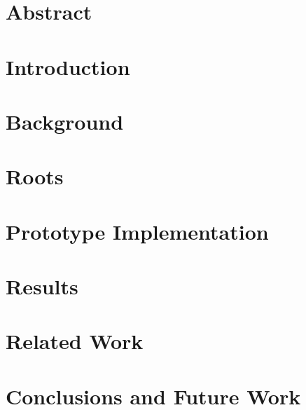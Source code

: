 \section{Abstract}


\section{Introduction}
\label{sec:roots_introduction}


\section{Background}
\label{sec:roots_background}


\section{Roots}
\label{sec:roots_arch}


\section{Prototype Implementation}
\label{sec:roots_impl}


\section{Results}
\label{sec:roots_results}


\section{Related Work}


\section{Conclusions and Future Work}
